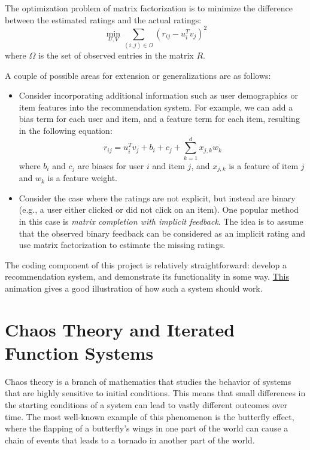 \documentclass{article}
\begin{document}
    \vspace{3mm}
    The optimization problem of matrix factorization is to minimize the difference between the estimated ratings and the actual ratings:
    $$\min_{U,V} \sum_{(i,j) \in \Omega}(r_{ij} - u_i^T v_j)^2$$ where $\Omega$ is the set of observed entries in the matrix $R$.
    
    \vspace{3mm}
    A couple of possible areas for extension or generalizations are as follows:
    \begin{itemize}
        \item Consider incorporating additional information such as user demographics or item features into the recommendation system. For example, we can add a bias term for each user and item, and a feature term for each item, resulting in the following equation: $$r_{ij} = u_i^T v_j + b_i + c_j + \sum_{k = 1}^{d} x_{j,k}w_{k}$$ where $b_i$ and $c_j$ are biases for user $i$ and item $j$, and $x_{j,k}$ is a feature of item $j$ and $w_k$ is a feature weight.
        \item Consider the case where the ratings are not explicit, but instead are binary (e.g., a user either clicked or did not click on an item). One popular method in this case is \textit{matrix completion with implicit feedback}. The idea is to assume that the observed binary feedback can be considered as an implicit rating and use matrix factorization to estimate the missing ratings.
    \end{itemize}
    The coding component of this project is relatively straightforward: develop a recommendation system, and demonstrate its functionality in some way. \href{https://en.wikipedia.org/wiki/Collaborative_filtering#/media/File:Collaborative_filtering.gif}{This} animation gives a good illustration of how such a system should work.

\pagebreak

\section{Chaos Theory and Iterated Function Systems}
    Chaos theory is a branch of mathematics that studies the behavior of systems that are highly sensitive to initial conditions. This means that small differences in the starting conditions of a system can lead to vastly different outcomes over time. The most well-known example of this phenomenon is the butterfly effect, where the flapping of a butterfly's wings in one part of the world can cause a chain of events that leads to a tornado in another part of the world.
    
\end{document}
